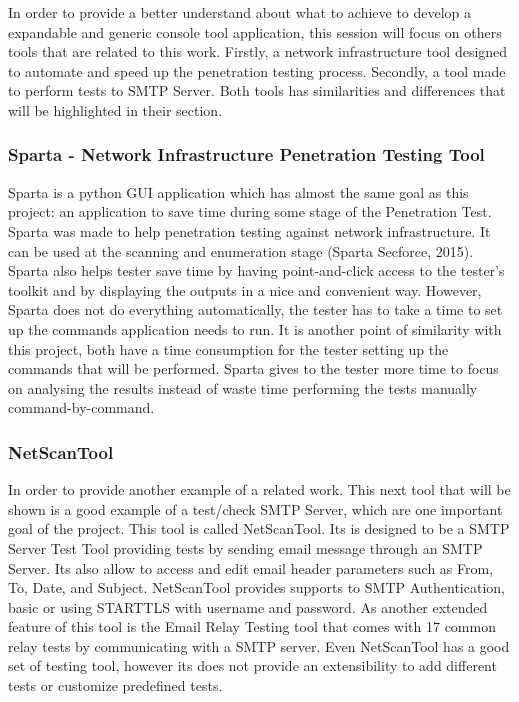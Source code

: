\documentclass[a4paper, 12pt]{article}
\begin{document}
In order to provide a better understand about what to achieve to develop a expandable and generic console tool application, this session will focus on others tools that are related to this work. Firstly, a network infrastructure tool designed to automate and speed up the penetration testing process. Secondly, a tool made to perform tests to SMTP Server. Both tools has similarities and differences that will be highlighted in their section.


\subsubsection{Sparta - Network Infrastructure Penetration Testing Tool}

Sparta is a python GUI application which has almost the same goal as this project: an application to save time during some stage of the Penetration Test. Sparta was made to help penetration testing against network infrastructure. It can be used at the scanning and enumeration stage (Sparta Secforce, 2015). Sparta also helps tester save time by having point-and-click access to the tester's toolkit and by displaying the outputs in a nice and convenient way. However, Sparta does not do everything automatically, the tester has to take a time to set up the commands application needs to run. It is another point of similarity with this project, both  have a time consumption for the tester setting up the commands that will be performed. Sparta gives to the tester more time to focus on analysing the results instead of waste time performing the tests manually command-by-command. 

\subsubsection{NetScanTool}

In order to provide another example of a related work. This next tool that will be shown is a good example of a test/check SMTP Server, which are one important goal of the project. This tool is called NetScanTool. Its is designed  to be a SMTP Server Test Tool providing tests by sending email message through an SMTP Server. Its also allow to access and edit email header parameters such as From, To, Date, and Subject. NetScanTool provides supports to SMTP Authentication, basic or using STARTTLS with username and password. As another extended feature of this tool is the Email Relay Testing tool that comes with 17 common relay tests by communicating with a SMTP server. Even NetScanTool has a good set of testing tool, however its does not provide an extensibility to add different tests or customize predefined tests.
\end{document}
